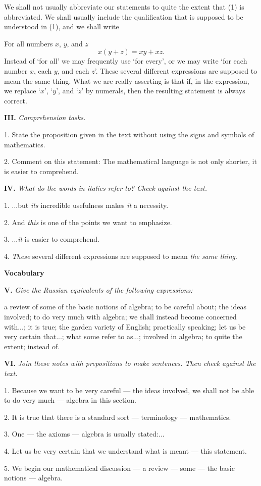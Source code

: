 \documentclass[a4paper]{article}
\newcommand{\ESect}[1]{\medskip\par{\large \textbf{#1}}\par}
\newcommand{\ETask}[2]{\medskip\par\textbf{#1.} \textit{#2}\par}
\newcommand{\Eqn}[1]{\begin{equation}#1\end{equation}}
\begin{document}
We shall not usually abbreviate our statements to quite the extent that (1) is abbreviated. We shall usually include the
qualification that is supposed to be understood in (1), and we shall write

For all numbers $x$, $y$, and $z$
\Eqn{x(y+z)=xy+xz.}
Instead of `for all' we may frequently use `for every', or we may write `for each number $x$, each $y$, and each $z$'.
These several different expressions are supposed to mean the same thing. What we are really asserting is that if, in the expression,
we replace `$x$', `$y$', and `$z$' by numerals, then the resulting statement is always correct.

\ETask{III}{Comprehension tasks.}
1. State the proposition given in the text without using the signs and symbols of mathematics.

2. Comment on this statement: The mathematical language is not only shorter, it is easier to comprehend.

\ETask{IV}{What do the words in italics refer to? Check against the text.}
1. ...but \textit{its} incredible usefulness makes \textit{it} a necessity.

2. And \textit{this} is one of the points we want to emphasize.

3. ...\textit{it} is easier to comprehend.

4. \textit{These} several different expressions are supposed to mean \textit{the same thing}.

\ESect{Vocabulary}
\ETask{V}{Give the Russian equivalents of the following expressions:}
a review of some of the basic notions of algebra; to be careful about; the ideas involved; to do very much with algebra;
we shall instead become concerned with...; it is true; the garden variety of English; practically speaking; let us be very
certain that...; what some refer to as...; involved in algebra; to quite the extent; instead of.

\ETask{VI}{Join these notes with prepositions to make sentences. Then check against the text.}
1. Because we want to be very careful --- the ideas involved, we shall not be able to do very much --- algebra in this section.

2. It is true that there is a standard sort --- terminology --- mathematics.

3. One --- the axioms --- algebra is usually stated:...

4. Let us be very certain that we understand what is meant --- this statement.

5. We begin our mathematical discussion --- a review --- some --- the basic notions --- algebra.
\end{document}
